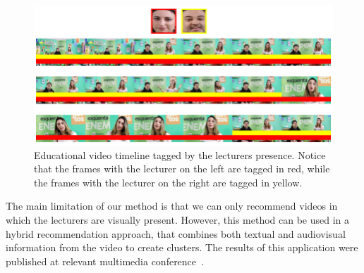 \begin{figure}[!ht]
  \centering
  \includegraphics[width=0.8\linewidth]{img/face_clustering/example_education.png}
  \caption{Educational video timeline tagged by the lecturers presence. Notice that the frames with the lecturer on the left are tagged in red, while the frames with the lecturer on the right are tagged in yellow.}
  \label{fig:video_timeline}
\end{figure}

The main limitation of our method is that we can only recommend videos in which the lecturers are visually present. However, this method can be used in a hybrid recommendation approach, that combines both textual and audiovisual information from the video to create clusters. 
The results of this application were published at relevant multimedia conference~\cite{mendes2020ISM}.